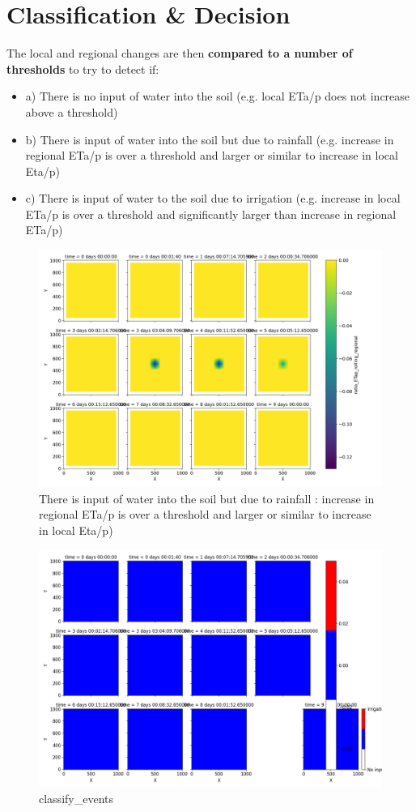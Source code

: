 \documentclass{article}
\begin{document}
\section{Classification \& Decision}

The local and regional changes are then \textbf{compared to a number of thresholds} to try to detect if:

\begin{itemize}
\item a) There is no input of water into the soil (e.g. local ETa/p does not increase above a threshold)
\item b) There is input of water into the soil but due to rainfall (e.g. increase in regional ETa/p is over a
threshold and larger or similar to increase in local Eta/p)
\item c) There is input of water to the soil due to irrigation (e.g. increase in local ETa/p is over a
threshold and significantly larger than increase in regional ETa/p)
\end{itemize}

\begin{figure}[!htbp]
\centering
\includegraphics[width=0.875\linewidth]{files/ratioETap_regional_w-2c79d25fb6ed135ae56de174f4100705.png}
\caption*{There is input of water into the soil but due to rainfall : increase in regional ETa/p is over a
threshold and larger or similar to increase in local Eta/p)}
\end{figure}

\begin{figure}[!htbp]
\centering
\includegraphics[width=0.875\linewidth]{files/classify_events-61db58665a3dabf47f3a3f60a5ac0fe0.png}
\caption*{classify\_events}
\end{figure}
\end{document}
